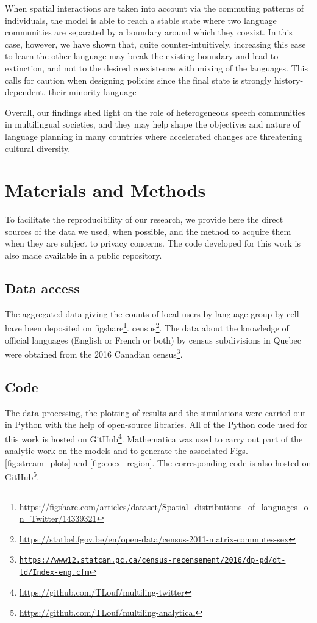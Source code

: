 \documentclass[../thesis.tex]{subfiles}
\begin{document}
When spatial interactions are taken into account via the commuting patterns of
individuals, the model is able to reach a stable state where two language communities
are separated by a boundary around which they coexist. In this case, however, we have
shown that, quite counter-intuitively, increasing this ease to learn the other language
may break the existing boundary and lead to extinction, and not to the desired
coexistence with mixing of the languages. This calls for caution when designing policies
since the final state is strongly history-dependent. %
their minority language  

Overall, our findings shed light on the role of heterogeneous speech communities in
multilingual societies, and they may help shape the objectives and nature of language
planning \cite{KaplanLanguagePlanning1997} in many countries where accelerated changes
are threatening cultural diversity.



\section{Materials and Methods}
To facilitate the reproducibility of our research, we provide here the direct sources of
the data we used, when possible, and the method to acquire them when they are subject to
privacy concerns. The code developed for this work is also made available in a public
repository.


\subsection{Data access}
The aggregated data giving the counts of local users by language group by cell have been
deposited on
figshare\footnote{\url{https://figshare.com/articles/dataset/Spatial_distributions_of_languages_on_Twitter/14339321}}.
census\footnote{\url{https://statbel.fgov.be/en/open-data/census-2011-matrix-commutes-sex}}.
The data about the knowledge of official languages (English or French or both) by census
subdivisions in Quebec were obtained from the 2016 Canadian
census\footnote{\href{https://www12.statcan.gc.ca/census-recensement/2016/dp-pd/dt-td/Rp-eng.cfm?TABID=2&LANG=E&A=R&APATH=3&DETAIL=0&DIM=0&FL=A&FREE=0&GC=01&GL=-1&GID=1159582&GK=1&GRP=1&O=D&PID=110461&PRID=10&PTYPE=109445&S=0&SHOWALL=0&SUB=0&Temporal=2016&THEME=118&VID=0&VNAMEE=&VNAMEF=&D1=0&D2=0&D3=0&D4=0&D5=0&D6=0}{\texttt{https://www12.statcan.gc.ca/census-recensement/2016/dp-pd/dt-td/Index-eng.cfm}}}.

\subsection{Code}
The data processing, the plotting of results and the simulations were carried out in
Python with the help of open-source libraries. All of the Python code used for this work
is hosted on GitHub\footnote{\url{https://github.com/TLouf/multiling-twitter}}.
Mathematica was used to carry out part of the analytic work on the models and to
generate the associated Figs. \ref{fig:stream_plots} and \ref{fig:coex_region}. The
corresponding code is also hosted on
GitHub\footnote{\url{https://github.com/TLouf/multiling-analytical}}.
\end{document}
